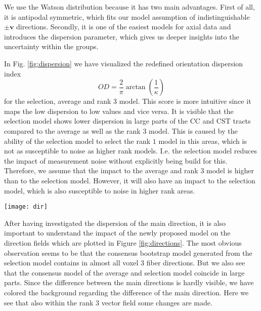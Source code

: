 We use the Watson distribution because it has two main advantages. First of all, it is antipodal symmetric,
which fits our model assumption of indistinguishable $\pm \mathbf{v}$
directions. Secondly, it is one of the easiest models for axial data and
introduces the dispersion parameter, which gives  us deeper insights into the
uncertainty within the groups. 

In Fig. \ref{fig:dispersion} we have visualized the redefined orientation dispersion index
\cite{dispersionParameter}  
\[ OD = \frac{2}{\pi} \arctan \left( \frac{1}{\kappa} \right) \] 
for the selection, average and rank 3 model. This score is more intuitive since
it maps the low dispersion to low values and vice versa. It is visible that the
selection model shows lower dispersion in large parts of the CC and CST tracts
compared to the average as well as the rank $3$ model. This is caused by the
ability of the selection model to select the rank $1$ model in this areas, which
is not as susceptible to noise as higher rank models. I.e. the selection model
reduces the impact of measurement noise without explicitly being build for
this. 
Therefore, we assume that the impact to the average and rank $3$ model is higher
than to the selection model. However, it will also have an impact to the
selection model, which is also susceptible to noise in higher rank areas. 

\begin{figure*}[t]
	\centering
	\texttt{[image: dir]}
	\caption{Reconstructed fiber orientations of the different models, the
	red box in the left image denotes the position within the brain. Top row
shows models without consensus bootstrapping, bottom row with consensus
bootstrapping. From left to right: Averaging model, selection model, rank-$3$
model.}
	\label{fig:directions}
\end{figure*}

After having investigated the dispersion of the main direction, it is also
important to understand the impact of the newly proposed model on the direction
fields which are plotted in Figure \ref{fig:directions}. 
The most obvious observation seems to be that the consensus bootstrap model generated
from the selection model contains in almost all voxel 3 fiber directions. But we
also see that the consensus model of the average and selection model coincide in
large parts. 
Since the difference between the main directions is hardly visible, we have
colored the background regarding the difference of the main direction. Here we
see that also within the rank $3$ vector field some changes are made. 

